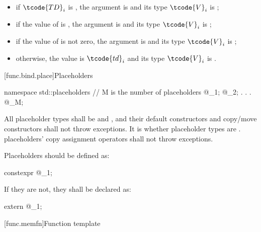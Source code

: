 \begin{itemize}
\item if $\tcode{TD}_i$ is , the
argument is  and its type $\tcode{V}_i$ is ;

\item if the value of 
is , the argument is   and its
type $\tcode{V}_i$ is
;

\item if the value  of 
is not zero, the  argument is 
and its type $\tcode{V}_i$
is ;

\item otherwise, the value is $\tcode{td}_i$ and its type $\tcode{V}_i$
is .
\end{itemize}
%

[func.bind.place]{Placeholders}

%
%
\begin{codeblock}
namespace std::placeholders {
  // M is the  number of placeholders
  @\seebelow@ _1;
  @\seebelow@ _2;
              .
              .
              .
  @\seebelow@ _M;
}
\end{codeblock}

\pnum
All placeholder types shall be  and
, and their default constructors and copy/move
constructors shall not throw exceptions. It is  whether
placeholder types are .  placeholders' copy
assignment operators shall not throw exceptions.

\pnum
Placeholders should be defined as:
\begin{codeblock}
constexpr @\unspec@ _1{};
\end{codeblock}
If they are not, they shall be declared as:
\begin{codeblock}
extern @\unspec@ _1;
\end{codeblock}%

[func.memfn]{Function template }%

